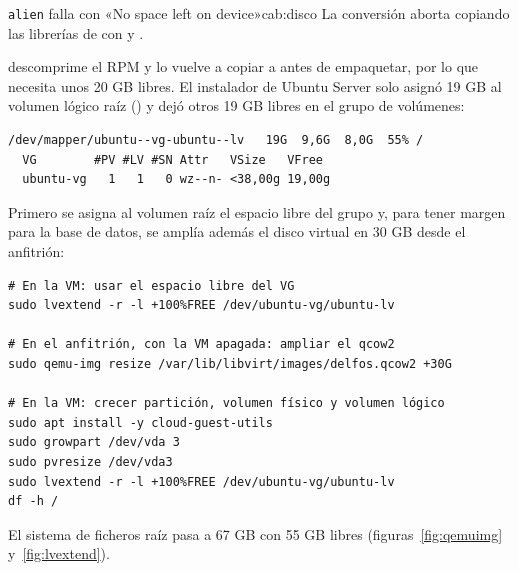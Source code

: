 \begin{cabezazo}{\texttt{alien} falla con «No space left on device»}{cab:disco}
\problema La conversión aborta copiando las librerías de
 con  y
.

\causa {} descomprime el RPM y lo vuelve a copiar a
 antes de empaquetar, por lo que necesita unos 20 GB libres. El
instalador de Ubuntu Server solo asignó 19 GB al volumen lógico raíz
() y dejó otros 19 GB libres en el grupo de volúmenes:

\begin{lstlisting}[style=fichero]
/dev/mapper/ubuntu--vg-ubuntu--lv   19G  9,6G  8,0G  55% /
  VG        #PV #LV #SN Attr   VSize   VFree
  ubuntu-vg   1   1   0 wz--n- <38,00g 19,00g
\end{lstlisting}

\solucion Primero se asigna al volumen raíz el espacio libre del grupo y,
para tener margen para la base de datos, se amplía además el disco virtual en
30 GB desde el anfitrión:

\begin{lstlisting}[style=bash]
# En la VM: usar el espacio libre del VG
sudo lvextend -r -l +100%FREE /dev/ubuntu-vg/ubuntu-lv

# En el anfitrión, con la VM apagada: ampliar el qcow2
sudo qemu-img resize /var/lib/libvirt/images/delfos.qcow2 +30G

# En la VM: crecer partición, volumen físico y volumen lógico
sudo apt install -y cloud-guest-utils
sudo growpart /dev/vda 3
sudo pvresize /dev/vda3
sudo lvextend -r -l +100%FREE /dev/ubuntu-vg/ubuntu-lv
df -h /
\end{lstlisting}

El sistema de ficheros raíz pasa a 67 GB con 55 GB libres
(figuras~\ref{fig:qemuimg} y~\ref{fig:lvextend}).
\end{cabezazo}




